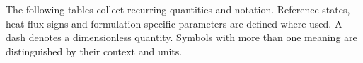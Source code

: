 \label{chap:nomenclature}

The following tables collect recurring quantities and notation. Reference
states, heat-flux signs and formulation-specific parameters are defined where
used. A dash denotes a dimensionless quantity. Symbols with more than one
meaning are distinguished by their context and units.

\begingroup
\makeatletter
\let\@tum@activate@layout@\relax
\makeatother
\small
\renewcommand{\arraystretch}{1.0}
\setlength{\tabcolsep}{4pt}
\setlength{\LTleft}{0pt}
\setlength{\LTright}{\fill}


